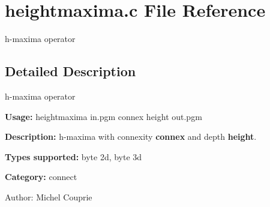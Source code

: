 \section{heightmaxima.c File Reference}
\label{heightmaxima_8c}
h-maxima operator  




\label{_details}
\subsection{Detailed Description}
h-maxima operator 

{\bf Usage:} heightmaxima in.pgm connex height out.pgm

{\bf Description:} h-maxima with connexity {\bf connex} and depth {\bf height}.

{\bf Types supported:} byte 2d, byte 3d

{\bf Category:} connect

\begin{Desc}
\item[Author:]Michel Couprie \end{Desc}
